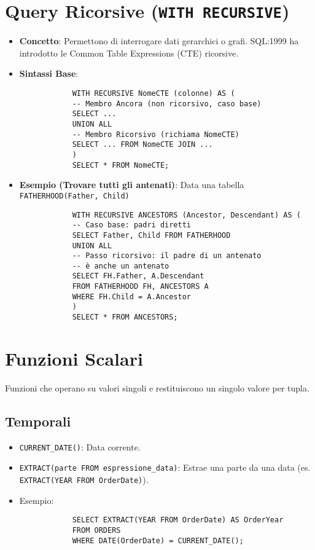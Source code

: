 \documentclass{article}
\begin{document}
	\section{Query Ricorsive (\texttt{WITH RECURSIVE})}
	\begin{itemize}
		\item \textbf{Concetto}: Permettono di interrogare dati gerarchici o grafi. SQL:1999 ha introdotto le Common Table Expressions (CTE) ricorsive.
		\item \textbf{Sintassi Base}:
		\begin{verbatim}
			WITH RECURSIVE NomeCTE (colonne) AS (
			-- Membro Ancora (non ricorsivo, caso base)
			SELECT ...
			UNION ALL
			-- Membro Ricorsivo (richiama NomeCTE)
			SELECT ... FROM NomeCTE JOIN ...
			)
			SELECT * FROM NomeCTE;
		\end{verbatim}
		\item \textbf{Esempio (Trovare tutti gli antenati)}: Data una tabella \texttt{FATHERHOOD(Father, Child)}
		\begin{verbatim}
			WITH RECURSIVE ANCESTORS (Ancestor, Descendant) AS (
			-- Caso base: padri diretti
			SELECT Father, Child FROM FATHERHOOD
			UNION ALL
			-- Passo ricorsivo: il padre di un antenato
			-- è anche un antenato
			SELECT FH.Father, A.Descendant
			FROM FATHERHOOD FH, ANCESTORS A
			WHERE FH.Child = A.Ancestor
			)
			SELECT * FROM ANCESTORS;
		\end{verbatim}
	\end{itemize}
	
	\section{Funzioni Scalari}
	Funzioni che operano su valori singoli e restituiscono un singolo valore per tupla.
	
	\subsection{Temporali}
	\begin{itemize}
		\item \texttt{CURRENT\_DATE()}: Data corrente.
		\item \texttt{EXTRACT(parte FROM espressione\_data)}: Estrae una parte da una data (es. \texttt{EXTRACT(YEAR FROM OrderDate)}).
		\item Esempio:
		\begin{verbatim}
			SELECT EXTRACT(YEAR FROM OrderDate) AS OrderYear
			FROM ORDERS
			WHERE DATE(OrderDate) = CURRENT_DATE();
		\end{verbatim}
	\end{itemize}
	
\end{document}

